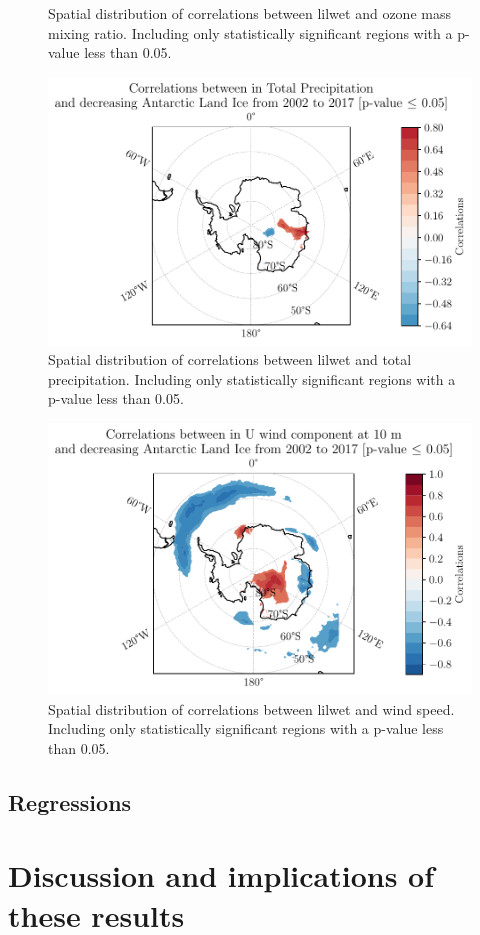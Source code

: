 \documentclass[../main.tex]{subfiles}
\begin{document}
\begin{figure}[hbt!]
\begin{subfigure}[b]{0.45\textwidth}
    \end{subfigure}
    \caption{Spatial distribution of correlations between \gls{lilwet} and ozone mass mixing ratio. Including only statistically significant regions with a p-value less than 0.05.}
    \label{fig:correlation_spatial_o3_50}
\end{figure}
\begin{figure}[hbt!]
    \centering
    \includegraphics{images/2021w5/chapter7/hres/decreasing_correlation_spatial_tp}
    \caption{Spatial distribution of correlations between \gls{lilwet} and total precipitation. Including only statistically significant regions with a p-value less than 0.05.}
    \label{fig:my_label}
\end{figure}
\begin{figure}[hbt!]
    \centering
    \includegraphics{images/2021w5/chapter7/hres/decreasing_correlation_spatial_u_10}
    \caption{Spatial distribution of correlations between \gls{lilwet} and wind speed. Including only statistically significant regions with a p-value less than 0.05.}
    \label{fig:my_label}
\end{figure}

\FloatBarrier
\subsection{Regressions}

\FloatBarrier
\section{Discussion and implications of these results}
\end{document}
